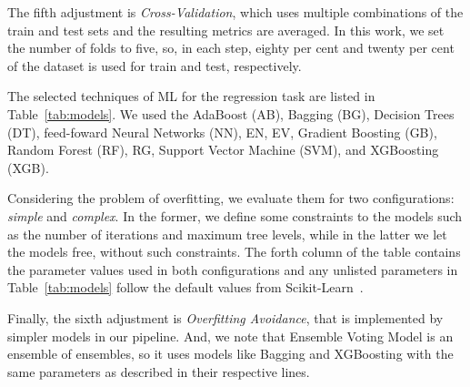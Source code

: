 The fifth adjustment is \emph{Cross-Validation}, which uses multiple combinations of the train and test sets and the resulting metrics are averaged. In this work, we set the number of folds to five, so, in each step, eighty per cent and twenty per cent of the dataset is used for train and test, respectively.

The selected techniques of ML for the regression task are listed in Table~\ref{tab:models}. We used the AdaBoost (AB), Bagging (BG), Decision Trees (DT), feed-foward Neural Networks (NN), \gls{EN}, \gls{EV}, Gradient Boosting (GB), Random Forest (RF), \gls{RG}, Support Vector Machine (SVM), and XGBoosting (XGB). 

Considering the problem of overfitting, we evaluate them for two configurations: \textit{simple} and \textit{complex}. In the former, we define some constraints to the models such as the number of iterations and maximum tree levels, while in the latter we let the models free, without such constraints. The forth column of the table contains the parameter values used in both configurations and any unlisted parameters in Table~\ref{tab:models} follow the default values from Scikit-Learn~\cite{Pedregosa2012}. 

Finally, the sixth adjustment is \emph{Overfitting Avoidance}, that is implemented by simpler models in our pipeline. And, we note that Ensemble Voting Model is an ensemble of ensembles, so it uses models like Bagging and XGBoosting with the same parameters as described in their respective lines.


